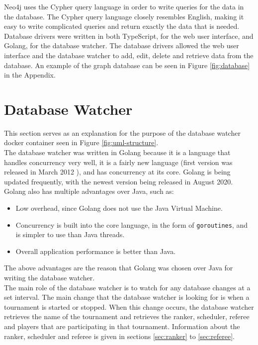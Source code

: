 \documentclass[a4paper, 11pt]{report}
\begin{document}
Neo4j uses the Cypher query language in order to write queries for the data in
the database. The Cypher query language closely resembles English, making it easy
to write complicated queries and return exactly the data that is needed. Database
drivers were written in both TypeScript, for the web user interface, and Golang,
for the database watcher. The database drivers allowed the web user interface
and the database watcher to add, edit, delete and retrieve data from the
database. An example of the graph database can be seen in Figure \ref{fig:database}
in the Appendix.

\section{Database Watcher}

This section serves as an explanation for the purpose of the database watcher
docker container seen in Figure \ref{fig:uml-structure}. \\

The database watcher was written in Golang because it is a language that handles
concurrency very well, it is a fairly new language (first version was released
in March 2012 \cite{golang}), and has concurrency at its core. Golang is being
updated frequently, with the newest version being released in August 2020. Golang
also has multiple advantages over Java, such as:
\begin{itemize}
	\item Low overhead, since Golang does not use the Java Virtual Machine.
	\item Concurrency is built into the core language, in the form of \texttt{goroutines},
	and is simpler to use than Java threads.
	\item Overall application performance is better than Java.
\end{itemize}
The above advantages are the reason that Golang was chosen over Java for writing
the database watcher. \\

The main role of the database watcher is to watch for any database changes at a
set interval. The main change that the database watcher is looking for is when a
tournament is started or stopped. When this change occurs, the database watcher
retrieves the name of the tournament and retrieves the ranker, scheduler, referee
and players that are participating in that tournament. Information about the
ranker, scheduler and referee is given in sections \ref{sec:ranker} to
\ref{sec:referee}.
\end{document}
